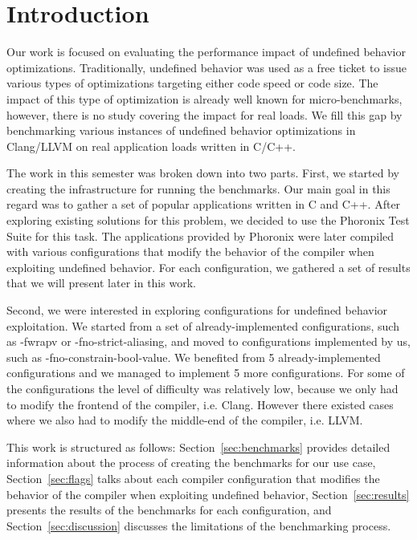 \section{Introduction}

Our work is focused on evaluating the performance impact of undefined behavior
optimizations. Traditionally, undefined behavior was used as a free ticket to
issue various types of optimizations targeting either code speed or code size.
The impact of this type of optimization is already well known for
micro-benchmarks, however, there is no study covering the impact for real loads.
We fill this gap by benchmarking various instances of undefined behavior
optimizations in Clang/LLVM on real application loads written in C/C++.

The work in this semester was broken down into two parts. First, we started by
creating the infrastructure for running the benchmarks. Our main goal in this
regard was to gather a set of popular applications written in C and C++. After
exploring existing solutions for this problem, we decided to use the Phoronix
Test Suite for this task. The applications provided by Phoronix were later
compiled with various configurations that modify the behavior of the compiler
when exploiting undefined behavior. For each configuration, we gathered a set of
results that we will present later in this work.

Second, we were interested in exploring configurations for undefined behavior
exploitation. We started from a set of already-implemented configurations, such
as -fwrapv or -fno-strict-aliasing, and moved to configurations implemented by
us, such as -fno-constrain-bool-value. We benefited from 5 already-implemented
configurations and we managed to implement 5 more configurations. For some of
the configurations the level of difficulty was relatively low, because we only
had to modify the frontend of the compiler, i.e. Clang. However there existed
cases where we also had to modify the middle-end of the compiler, i.e. LLVM.

This work is structured as follows: Section~\ref{sec:benchmarks} provides
detailed information about the process of creating the benchmarks for our use
case, Section~\ref{sec:flags} talks about each compiler configuration that
modifies the behavior of the compiler when exploiting undefined behavior,
Section~\ref{sec:results} presents the results of the benchmarks for each
configuration, and Section~\ref{sec:discussion} discusses the limitations of the
benchmarking process.
